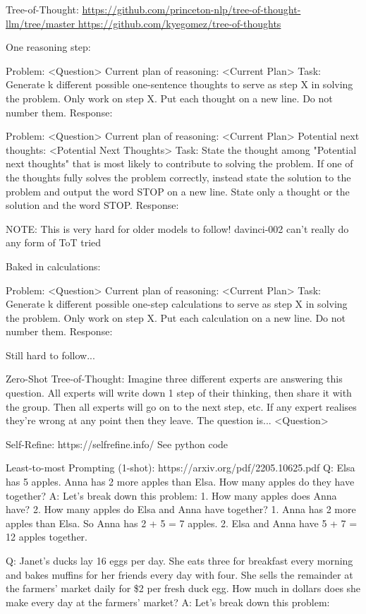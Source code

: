 \documentclass[11pt]{article}
\begin{document}
Tree-of-Thought: \url{https://github.com/princeton-nlp/tree-of-thought-llm/tree/master https://github.com/kyegomez/tree-of-thoughts}

One reasoning step:

Problem:
<Question>
Current plan of reasoning:
<Current Plan>
Task:
Generate {k} different possible one-sentence thoughts to serve as step {X} in solving the problem. Only work on step {X}. Put each thought on a new line. Do not number them.
Response:

Problem:
<Question> 
Current plan of reasoning:
<Current Plan>
Potential next thoughts:
<Potential Next Thoughts>
Task:
State the thought among "Potential next thoughts" that is most likely to contribute to solving the problem. If one of the thoughts fully solves the problem correctly, instead state the solution to the problem and output the word STOP on a new line. State only a thought or the solution and the word STOP.
Response:

NOTE: This is very hard for older models to follow! davinci-002 can't really do any form of ToT tried

Baked in calculations:

Problem:
<Question> 
Current plan of reasoning:
<Current Plan>
Task:
Generate {k} different possible one-step calculations to serve as step {X} in solving the problem. Only work on step {X}. Put each calculation on a new line. Do not number them.
Response:

Still hard to follow...

Zero-Shot Tree-of-Thought:
Imagine three different experts are answering this question.
All experts will write down 1 step of their thinking,
then share it with the group.
Then all experts will go on to the next step, etc.
If any expert realises they're wrong at any point then they leave.
The question is...
<Question>

Self-Refine: https://selfrefine.info/
See python code

Least-to-most Prompting (1-shot): https://arxiv.org/pdf/2205.10625.pdf
Q: Elsa has 5 apples. Anna has 2 more apples than Elsa. How many apples do they have together?
A: Let's break down this problem: 1. How many apples does Anna have? 2. How many apples do Elsa and Anna have together?
1. Anna has 2 more apples than Elsa. So Anna has 2 + 5 = 7 apples.
2. Elsa and Anna have 5 + 7 = 12 apples together.

Q: Janet's ducks lay 16 eggs per day. She eats three for breakfast every morning and bakes muffins for her friends every day with four. She sells the remainder at the farmers' market daily for \$2 per fresh duck egg. How much in dollars does she make every day at the farmers' market?
A: Let's break down this problem:
\end{document}
